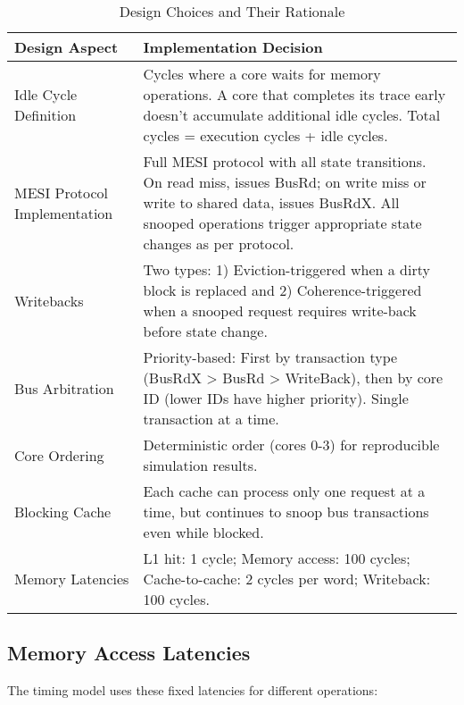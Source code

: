 \documentclass[11pt]{article}
\begin{document}
\begin{table}[H]
\centering
\caption{Design Choices and Their Rationale}
\begin{tabular}{|p{3cm}|p{12cm}|}
\hline
\textbf{Design Aspect} & \textbf{Implementation Decision} \\
\hline
Idle Cycle Definition & Cycles where a core waits for memory operations. A core that completes its trace early doesn't accumulate additional idle cycles. Total cycles = execution cycles + idle cycles. \\
\hline
MESI Protocol Implementation & Full MESI protocol with all state transitions. On read miss, issues BusRd; on write miss or write to shared data, issues BusRdX. All snooped operations trigger appropriate state changes as per protocol. \\
\hline
Writebacks & Two types: 1) Eviction-triggered when a dirty block is replaced and 2) Coherence-triggered when a snooped request requires write-back before state change. \\
\hline
Bus Arbitration & Priority-based: First by transaction type (BusRdX > BusRd > WriteBack), then by core ID (lower IDs have higher priority). Single transaction at a time. \\
\hline
Core Ordering & Deterministic order (cores 0-3) for reproducible simulation results. \\
\hline
Blocking Cache & Each cache can process only one request at a time, but continues to snoop bus transactions even while blocked. \\
\hline
Memory Latencies & L1 hit: 1 cycle; Memory access: 100 cycles; Cache-to-cache: 2 cycles per word; Writeback: 100 cycles. \\
\hline
\end{tabular}
\end{table}

\subsection{Memory Access Latencies}

The timing model uses these fixed latencies for different operations:
\end{document}
